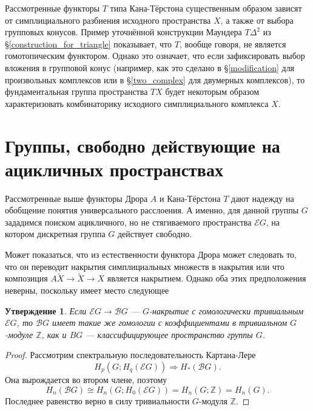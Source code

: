 \documentclass[14pt, dvipsnames, twoside]{extarticle}
\newtheorem{statement}{Утверждение}
\theoremstyle{definition}
\theoremstyle{remark}
\begin{document}
Рассмотренные функторы $T$ типа Кана-Тёрстона существенным образом зависят от симплициального разбиения исходного пространства $X$, а также от выбора групповых конусов. Пример уточнённой конструкции Маундера $T\Delta^2$ из \S\ref{construction_for_triangle} показывает, что $T$, вообще говоря, не является гомотопическим функтором. Однако это означает, что если зафиксировать выбор вложения в групповой конус (например, как это сделано в \S\ref{modification} для произвольных комплексов или в \S\ref{two_complex} для двумерных комплексов), то фундаментальная группа пространства $TX$ будет некоторым образом характеризовать комбинаторику исходного симплициального комплекса $X$.    













\section{Группы, свободно действующие на ацикличных пространствах}


Рассмотренные выше функторы Дрора $A$ и Кана-Тёрстона $T$ дают надежду на обобщение понятия универсального расслоения. А именно, для данной группы $G$ зададимся поиском ацикличного, но не стягиваемого пространства $\mathcal{E}G$, на котором дискретная группа $G$ действует свободно.

Может показаться, что из естественности функтора Дрора может следовать то, что он переводит накрытия симплициальных множеств в накрытия или что композиция $A\widetilde{X}\to \widetilde{X}\to X$ является накрытием. Однако оба этих предположения неверны, поскольку имеет место следующее

\begin{statement}\label{BG}
Если $\mathcal{E}G\to \mathcal{B}G$ --- $G$-накрытие с гомологически тривиальным $\mathcal{E}G$, то $\mathcal{B}G$ имеет такие же гомологии с коэффициентами в тривиальном $G$-модуле $\mathbb{Z}$, как и $BG$ --- классифицирующее пространство группы $G$.
\end{statement}

\begin{proof}
Рассмотрим спектральную последовательность Картана-Лере $$H_p(G; H_q(\mathcal{E}G))\Rightarrow H_\ast(\mathcal{B}G).$$ Она вырождается во втором члене, поэтому $$H_n(\mathcal{B}G)\cong H_n(G; H_0(\mathcal{E}G)) = H_n(G; \mathbb{Z}) = H_n(G).$$ Последнее равенство верно в силу тривиальности $G$-модуля $\mathbb{Z}$.
\end{proof}
\end{document}

